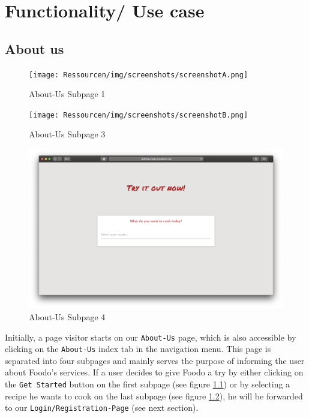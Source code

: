 \chapter{Functionality/ Use case}
\section*{About us}
\vspace{-1em}
\begin{figure}[H]
	\captionsetup{justification=centering}
	\begin{center}
		\texttt{[image: Ressourcen/img/screenshots/screenshotA.png]}
		\vspace{-3em}
		\caption{About-Us Subpage 1}
		\label{fig:subpage}
	\end{center}
\end{figure}
\vspace{-1em}
\begin{figure}[H]
	\captionsetup{justification=centering}
	\begin{center}
		\texttt{[image: Ressourcen/img/screenshots/screenshotB.png]}
		\vspace{-3em}
		\caption{About-Us Subpage 3}
	\end{center}
\end{figure}
\vspace{-1em}
\begin{figure}[H]
	\captionsetup{justification=centering}
	\begin{center}
		\includegraphics[scale=0.30]{Ressourcen/img/screenshots/screenshotC.png}
		\vspace{-3em}
		\caption{About-Us Subpage 4}
		\label{fig:subpage4}
	\end{center}
\end{figure}
\vspace{-3em}
Initially, a page visitor starts on our \texttt{About-Us} page, which is also accessible by clicking on the \texttt{About-Us} index tab in the navigation menu. This page is separated into four subpages and mainly serves the purpose of informing the user about Foodo's services. If a user decides to give Foodo a try by either clicking on the \texttt{Get Started} button on the first subpage (see figure \ref{fig:subpage}) or by selecting a recipe he wants to cook on the last subpage (see figure \ref{fig:subpage4}), he will be forwarded to our \texttt{Login/Registration-Page} (see next section).

